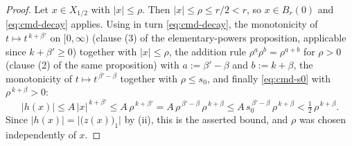 \begin{proof}
Let $x\in X_{1/2}$ with $\lvert x\rvert\le\rho$.  Then $\lvert x\rvert\le\rho\le r/2<r$, so
$x\in B_r(0)$ and \eqref{eq:cmd-decay} applies.  Using in turn \eqref{eq:cmd-decay}, the
monotonicity of $t\mapsto t^{\,k+\beta'}$ on $[0,\infty)$ (clause (3) of the elementary-powers
proposition, applicable since $k+\beta'\ge0$) together with $\lvert x\rvert\le\rho$, the
addition rule $\rho^{a}\rho^{b}=\rho^{a+b}$ for $\rho>0$ (clause (2) of the same proposition)
with $a:=\beta'-\beta$ and $b:=k+\beta$, the monotonicity of $t\mapsto t^{\,\beta'-\beta}$
together with $\rho\le s_0$, and finally \eqref{eq:cmd-s0} with $\rho^{\,k+\beta}>0$:
\[
  \lvert h(x)\rvert
  \le A\,\lvert x\rvert^{\,k+\beta'}
  \le A\,\rho^{\,k+\beta'}
  = A\,\rho^{\,\beta'-\beta}\,\rho^{\,k+\beta}
  \le A\,s_0^{\,\beta'-\beta}\,\rho^{\,k+\beta}
  <\tfrac12\,\rho^{\,k+\beta} .
\]
Since $\lvert h(x)\rvert=\bigl\lvert\bigl(z(x)\bigr)_1\bigr\rvert$ by (ii), this is the asserted
bound, and $\rho$ was chosen independently of $x$.
\end{proof}
